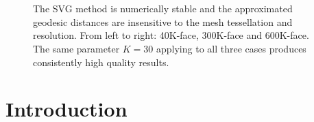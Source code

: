 \begin{figure}[htbp]
 { \setlength{\fboxsep}{0pt} \setlength{\fboxrule}{1pt}}
 {   \setlength{\fboxsep}{0pt} \setlength{\fboxrule}{1pt}}
 {   \setlength{\fboxsep}{0pt}
 \setlength{\fboxrule}{1pt}}\\
\begin{scriptsize}
  \\
\end{scriptsize}
\vspace{-0.1in} \caption{The SVG method is numerically stable and
the approximated geodesic distances are insensitive to the mesh
tessellation and resolution. From left to right: 40K-face, 300K-face
and 600K-face. The same parameter $K=30$ applying to all three cases
produces consistently high quality results. } \label{fig:buddha}
\end{figure} 



\section{Introduction}
\label{sec:introduction}


